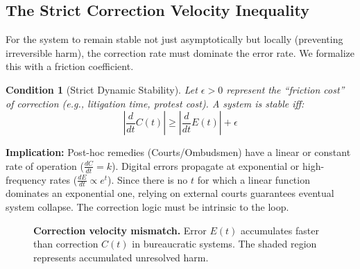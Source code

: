 \documentclass{article}
\newtheorem{condition}{Condition}
\begin{document}
\subsection{The Strict Correction Velocity Inequality}

For the system to remain stable not just asymptotically but locally (preventing irreversible harm), the correction rate must dominate the error rate. We formalize this with a friction coefficient.

\begin{condition}[Strict Dynamic Stability]
\label{cond:friction}
Let $\epsilon > 0$ represent the ``friction cost'' of correction (e.g., litigation time, protest cost). A system is stable iff:
\begin{equation}
\left| \frac{d}{dt} C(t) \right| \ge \left| \frac{d}{dt} E(t) \right| + \epsilon
\end{equation}
\end{condition}

\textbf{Implication:} Post-hoc remedies (Courts/Ombudsmen) have a linear or constant rate of operation ($\frac{dC}{dt} = k$). Digital errors propagate at exponential or high-frequency rates ($\frac{dE}{dt} \propto e^{t}$). Since there is no $t$ for which a linear function dominates an exponential one, relying on external courts guarantees eventual system collapse. The correction logic must be intrinsic to the loop.

\begin{figure}[htbp]
\centering
{}
\caption{\textbf{Correction velocity mismatch.} Error $E(t)$ accumulates faster than correction $C(t)$ in bureaucratic systems. The shaded region represents accumulated unresolved harm.}
\label{fig:velocity-mismatch}
\end{figure}
\end{document}
